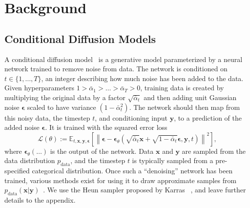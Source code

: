 \chapter{Background}
\section{Conditional Diffusion Models}
A conditional diffusion model~\cite{tashiro2021csdi, ddpm, sohldickstein} is a generative model parameterized by a neural network trained to remove noise from data. The network is conditioned on $t \in \{ 1, \ldots, T\}$, an integer describing how much noise has been added to the data. Given hyperparameters $1 > \bar{\alpha}_1 > \ldots > \bar{\alpha}_T > 0$, training data is created by multiplying the original data by a factor $\sqrt{\bar{\alpha}_t}$ and then adding unit Gaussian noise $\boldsymbol{\epsilon}$ scaled to have variance $(1-\bar{\alpha}_t^2)$. The network should then map from this noisy data, the timestep $t$, and conditioning input $\mathbf{y}$, to a prediction of the added noise $\boldsymbol{\epsilon}$. It is trained with the squared error loss
\begin{equation}
    \mathcal{L}(\theta):=\mathbb{E}_{t, \mathbf{x}, \mathbf{y}, \boldsymbol{\epsilon}}\left[\left\|\boldsymbol{\epsilon}-\boldsymbol{\epsilon}_\theta\left(\sqrt{\bar{\alpha}_t} \mathbf{x}+\sqrt{1-\bar{\alpha}_t} \boldsymbol{\epsilon}, \mathbf{y}, t\right)\right\|^2\right],
    \label{eq:lsimple}
\end{equation}
where $\boldsymbol{\epsilon}_\theta(\ldots)$ is the output of the network. Data $\mathbf{x}$ and $\mathbf{y}$ are sampled from the data distribution $p_\text{data}$, and the timestep $t$ is typically sampled from a pre-specified categorical distribution. Once such a ``denoising'' network has been trained, various methods exist for using it to draw approximate samples from $p_\text{data}(\mathbf{x}|\mathbf{y})$~\cite{ddpm,sohldickstein,tashiro2021csdi,song2020score,karras2022elucidating}. We use the Heun sampler proposed by Karras \etal~\cite{karras2022elucidating}, and leave further details to the appendix.

